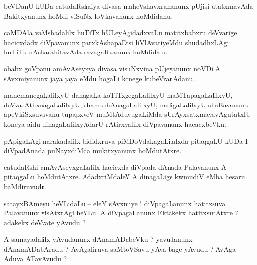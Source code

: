 \documentclass{article}
\begin{document}
\begin{mn}%
beVDanU kUDa catudaRshaiya divasa maheVshavxrananunx pUjisi utatxmavAda Bakitxyanunx hoMdi  viSuNx 
loVkavanunx hoMdidanu.
\end{mn}

\begin{mn}%
caMDAla vaMshadalilx huTiTx hULeyAgidadxvaLu matitxbabxru deVvarige hacicxdadx diVpavanunx 
parxkAshapaDisi liVlAvatiyeMdu shudadhxLAgi huTiTx nAsharahitavAda savxgaRvanunx hoMdidalu.
\end{mn}

\begin{mn}%
obabx goVpanu amAvAseyxya divasa visuNxvina pUjeyanunx noVDi A sAvxmiyanunx jaya jaya eMdu hogaLi 
konege kubeVranAdanu.
\end{mn}

\begin{mn}%
manemanegaLalilxyU danagaLa koTiTxgegaLalilxyU maMTapagaLalilxyU, deVvasAthxnagaLalilxyU, 
shamxshAnagaLalilxyU, nadigaLalilxyU shuBavanunx apeVkiSxsuvavanu tupapxveV muMtAduvugaLiMda 
sUrAyxsatxmayavAgutatxlU koneya aidu dinagaLalilxyAdarU rAtirxyalilx diVpavanunx hacacxbeVku.
\end{mn}

\begin{mn}%
pApigaLAgi narakadalilx bididxruva piMDoVdakagaLilalxda pitaqgaLU kUDa I diVpadAnada puNayxdiMda 
mukitxyanunx hoMdutAtxre.
\end{mn}

\begin{mn}%
catudaRshi amAvAseyxgaLalilx hacicxda diVpada dAnada Palavanunx A pitaqgaLu hoMdutAtxre. 
AdadxriMdaleV A dinagaLige kwmudiV eMba hesaru baMdiruvudu.
\end{mn}


\begin{mn}%
satayxBAmeyu heVLidaLu -- eleY sAvxmiye ! diVpagaLanunx hatitxsuva Palavanunx visAtxrAgi heVLu. A 
diVpagaLanunx Ektakekx hatitxsutAtxre ? adakekx deVvate yAvudu ?
\end{mn}

\begin{mn}%
A samayadalilx yAvudanunx dAnamADabeVku ? yavudanunx dAnamADabAradu ? AvAgaliruva saMtoVSavu yAva 
bage yAvudu ? AvAga Aduva ATavAvudu ?
\end{mn}
\end{document}

